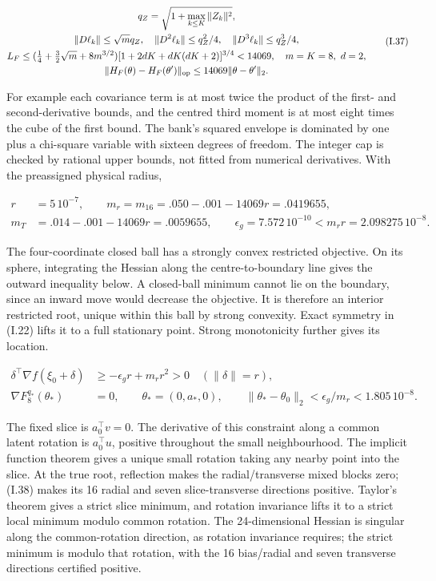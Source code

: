 \documentclass{article}
\begin{document}
\[
\begin{gathered}
q_Z=\sqrt{1+\max_{k\le K}\|Z_k\|^2},\\
\|D\ell_k\|\le\sqrt m q_Z,\quad\|D^2\ell_k\|\le q_Z^2/4,\quad\|D^3\ell_k\|\le q_Z^3/4,\\
L_F\le(\tfrac14+\tfrac32\sqrt m+8m^{3/2})
[1+2dK+dK(dK+2)]^{3/4}<14069,\quad m=K=8,\ d=2,\\
\|H_F(\theta)-H_F(\theta')\|_{\rm op}\le14069\|\theta-\theta'\|_2.
\end{gathered}
\tag{I.37}
\]

For example each covariance term is at most twice the product of the
first- and second-derivative bounds, and the centred third moment is at
most eight times the cube of the first bound. The bank's squared
envelope is dominated by one plus a chi-square variable with sixteen
degrees of freedom. The integer cap is checked by rational upper bounds,
not fitted from numerical derivatives. With the preassigned physical
radius,

\[
\begin{aligned}
r&=5\,10^{-7},\qquad
m_r=m_{16}=.050-.001-14069r=.0419655,\\
m_T&=.014-.001-14069r=.0059655,\qquad
\epsilon_g=7.572\,10^{-10}<m_rr=2.098275\,10^{-8}.
\end{aligned}
\tag{I.38}
\]

The four-coordinate closed ball has a strongly convex restricted
objective. On its sphere, integrating the Hessian along the
centre-to-boundary line gives the outward inequality below. A
closed-ball minimum cannot lie on the boundary, since an inward move
would decrease the objective. It is therefore an interior restricted
root, unique within this ball by strong convexity. Exact symmetry in
(I.22) lifts it to a full stationary point. Strong monotonicity further
gives its location.

\[
\begin{aligned}
\delta^\top\nabla f(\xi_0+\delta)&\ge-\epsilon_g r+m_rr^2>0\quad(\|\delta\|=r),\\
\nabla F_8^{q_*}(\theta_*)&=0,\qquad\theta_*=(0,a_*,0),\qquad
\|\theta_*-\theta_0\|_2<\epsilon_g/m_r<1.805\,10^{-8}.
\end{aligned}
\tag{I.39}
\]

The fixed slice is \(a_0^\top v=0\). The derivative of this constraint
along a common latent rotation is \(a_0^\top u\), positive throughout
the small neighbourhood. The implicit function theorem gives a unique
small rotation taking any nearby point into the slice. At the true root,
reflection makes the radial/transverse mixed blocks zero; (I.38) makes
its 16 radial and seven slice-transverse directions positive. Taylor's
theorem gives a strict slice minimum, and rotation invariance lifts it
to a strict local minimum modulo common rotation. The 24-dimensional
Hessian is singular along the common-rotation direction, as rotation
invariance requires; the strict minimum is modulo that rotation, with
the 16 bias/radial and seven transverse directions certified positive.
\end{document}
